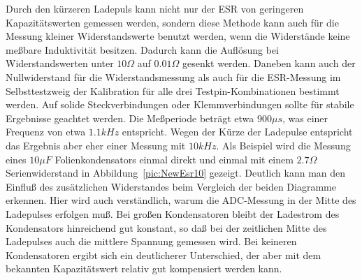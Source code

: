 Durch den kürzeren Ladepuls kann nicht nur der ESR von geringeren Kapazitätswerten gemessen werden, sondern
diese Methode kann auch für die Messung kleiner Widerstandswerte benutzt werden, wenn die Widerstände
keine meßbare Induktivität besitzen. Dadurch kann die Auflösung bei Widerstandswerten unter \(10 \Omega\) auf 
\(0.01 \Omega\) gesenkt werden. Daneben kann auch der Nullwiderstand für die Widerstandsmessung als auch
für die ESR-Messung im Selbsttestzweig der Kalibration für alle drei Testpin-Kombinationen bestimmt werden.
Auf solide Steckverbindungen oder Klemmverbindungen sollte für stabile Ergebnisse geachtet werden.
Die Meßperiode beträgt etwa \(900 \mu s\), was einer Frequenz von etwa \(1.1 kHz\) entspricht.
Wegen der Kürze der Ladepulse entspricht das Ergebnis aber eher einer Messung mit \(10 kHz\).
Als Beispiel wird die Messung eines \(10 \mu F\) Folienkondensators einmal direkt und einmal mit einem
\(2.7 \Omega\) Serienwiderstand in Abbildung~\ref{pic:NewEsr10} gezeigt.
Deutlich kann man den Einfluß des zusätzlichen Widerstandes beim Vergleich der beiden Diagramme erkennen.
Hier wird auch verständlich, warum die ADC-Messung in der Mitte des Ladepulses erfolgen muß.
Bei großen Kondensatoren bleibt der Ladestrom des Kondensators hinreichend gut konstant,
so daß bei der zeitlichen Mitte des Ladepulses auch die mittlere Spannung gemessen wird.
Bei keineren Kondensatoren ergibt sich ein deutlicherer Unterschied, der aber mit dem
bekannten Kapazitätswert relativ gut kompensiert werden kann.

